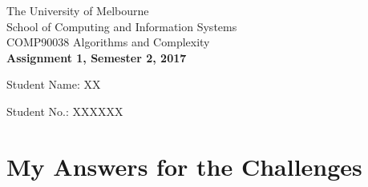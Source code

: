 \documentclass[11pt]{article}
\begin{document}
\begin{center}
{\sc The University of Melbourne
\\
School of Computing and Information Systems
\\ 
COMP90038 Algorithms and Complexity}
\bigskip \\
{\Large\bf Assignment 1, Semester 2, 2017}
\bigskip \\
{Student Name: XX 

Student No.: XXXXXX}
\end{center}

\section*{My Answers for the Challenges}
\end{document}
